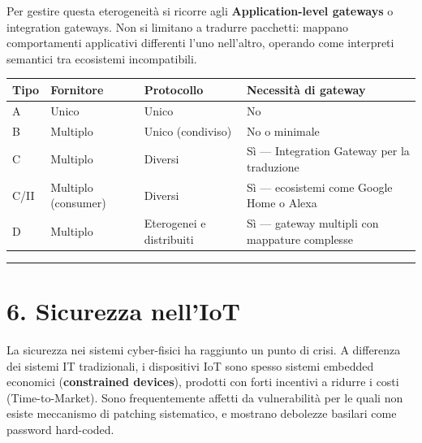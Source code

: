 \documentclass[
  italian,
  openany]{book}
\newcounter{none} %
\begin{document}
Per gestire questa eterogeneità si ricorre agli
\textbf{Application-level gateways} o integration gateways. Non si
limitano a tradurre pacchetti: mappano comportamenti applicativi
differenti l'uno nell'altro, operando come interpreti semantici tra
ecosistemi incompatibili.

{\def\LTcaptype{none} %
\begin{longtable}[]{@{}
  >{\raggedright\arraybackslash}p{}
  >{\raggedright\arraybackslash}p{}
  >{\raggedright\arraybackslash}p{}
  >{\raggedright\arraybackslash}p{}@{}}
\toprule\noalign{}
\begin{minipage}[b]{\linewidth}\raggedright
Tipo
\end{minipage} & \begin{minipage}[b]{\linewidth}\raggedright
Fornitore
\end{minipage} & \begin{minipage}[b]{\linewidth}\raggedright
Protocollo
\end{minipage} & \begin{minipage}[b]{\linewidth}\raggedright
Necessità di gateway
\end{minipage} \\
\midrule\noalign{}
\endhead
\bottomrule\noalign{}
\endlastfoot
A & Unico & Unico & No \\
B & Multiplo & Unico (condiviso) & No o minimale \\
C & Multiplo & Diversi & Sì --- Integration Gateway per la traduzione \\
C/II & Multiplo (consumer) & Diversi & Sì --- ecosistemi come Google
Home o Alexa \\
D & Multiplo & Eterogenei e distribuiti & Sì --- gateway multipli con
mappature complesse \\
\end{longtable}
}

\begin{center}\rule{0.5\linewidth}{0.5pt}\end{center}

\section{6. Sicurezza nell'IoT}\label{sicurezza-nelliot}

La sicurezza nei sistemi cyber-fisici ha raggiunto un punto di crisi. A
differenza dei sistemi IT tradizionali, i dispositivi IoT sono spesso
sistemi embedded economici (\textbf{constrained devices}), prodotti con
forti incentivi a ridurre i costi (Time-to-Market). Sono frequentemente
affetti da vulnerabilità per le quali non esiste meccanismo di patching
sistematico, e mostrano debolezze basilari come password hard-coded.
\end{document}
